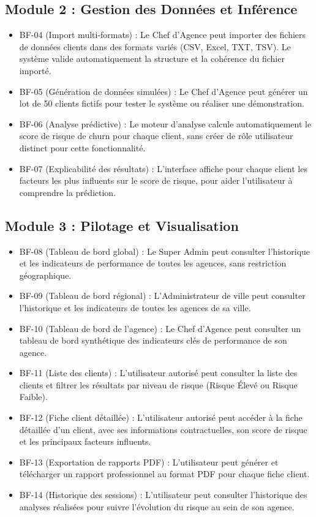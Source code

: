 \subsection{Module 2 : Gestion des Données et Inférence}
\begin{itemize}
    \item BF-04 (Import multi-formats) : Le Chef d'Agence peut importer des fichiers de données clients dans des formats variés (CSV, Excel, TXT, TSV). Le système valide automatiquement la structure et la cohérence du fichier importé.
    \item BF-05 (Génération de données simulées) : Le Chef d'Agence peut générer un lot de 50 clients fictifs pour tester le système ou réaliser une démonstration.
    \item BF-06 (Analyse prédictive) : Le moteur d'analyse calcule automatiquement le score de risque de churn pour chaque client, sans créer de rôle utilisateur distinct pour cette fonctionnalité.
    \item BF-07 (Explicabilité des résultats) : L'interface affiche pour chaque client les facteurs les plus influents sur le score de risque, pour aider l'utilisateur à comprendre la prédiction.
\end{itemize}

\subsection{Module 3 : Pilotage et Visualisation}
\begin{itemize}
    \item BF-08 (Tableau de bord global) : Le Super Admin peut consulter l'historique et les indicateurs de performance de toutes les agences, sans restriction géographique.
    \item BF-09 (Tableau de bord régional) : L'Administrateur de ville peut consulter l'historique et les indicateurs de toutes les agences de sa ville.
    \item BF-10 (Tableau de bord de l'agence) : Le Chef d'Agence peut consulter un tableau de bord synthétique des indicateurs clés de performance de son agence.
    \item BF-11 (Liste des clients) : L'utilisateur autorisé peut consulter la liste des clients et filtrer les résultats par niveau de risque (Risque Élevé ou Risque Faible).
    \item BF-12 (Fiche client détaillée) : L'utilisateur autorisé peut accéder à la fiche détaillée d'un client, avec ses informations contractuelles, son score de risque et les principaux facteurs influents.
    \item BF-13 (Exportation de rapports PDF) : L'utilisateur peut générer et télécharger un rapport professionnel au format PDF pour chaque fiche client.
    \item BF-14 (Historique des sessions) : L'utilisateur peut consulter l'historique des analyses réalisées pour suivre l'évolution du risque au sein de son agence.
\end{itemize}

